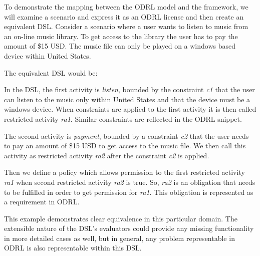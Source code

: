 To demonstrate the mapping between the ODRL model and the framework, we will examine a scenario and express it as an ODRL license and then create an equivalent DSL. Consider a scenario where a user wants to listen to music from an on-line music library. To get access to the library the user has to pay the amount of \$15 USD. The music file can only be played on a windows based device within United States.



\vfill\eject
The equivalent DSL would be:



In the DSL, the first activity is \emph{listen}, bounded by the constraint {\em c1} that the user can listen to the music only within United States and that the device must be a windows device. When constraints are applied to the first activity it is then called restricted activity {\em ra1}. Similar constraints are reflected in the ODRL snippet.

The second activity is \emph{payment}, bounded by a constraint {\em c2} that the user needs to pay an amount of \$15 USD to get access to the music file. We then call this activity as restricted activity {\em ra2} after the constraint {\em c2} is applied. 

Then we define a policy which allows permission to the first restricted activity {\em ra1} when second restricted activity {\em ra2} is true. So, {\em ra2} is an obligation that needs to be fulfilled in order to get permission for {\em ra1}. This obligation is represented as a requirement in ODRL.

This example demonstrates clear equivalence in this particular domain.  The extensible nature of the DSL's evaluators could provide any missing functionality in more detailed cases as well, but in general, any problem representable in ODRL is also representable within this DSL.